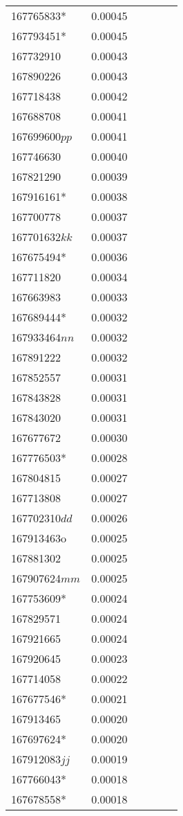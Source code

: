 \begin{landscape}
\begin{longtable}{p{1.8cm}p{0.9cm}p{2.2cm}p{1cm}p{2.8cm}p{13.4cm}}
167765833*&0.00045&&&& \\
167793451*&0.00045&&&& \\
167732910&0.00043&&&& \\
167890226&0.00043&&&& \\
167718438&0.00042&&&& \\
167688708&0.00041&&&& \\
167699600$pp$&0.00041&&&& \\
167746630&0.00040&&&& \\
167821290&0.00039&&&& \\
167916161*&0.00038&&&& \\
167700778&0.00037&&&& \\
167701632$kk$&0.00037&&&& \\
167675494*&0.00036&&&& \\
167711820&0.00034&&&& \\
167663983&0.00033&&&& \\
167689444*&0.00032&&&& \\
167933464$nn$&0.00032&&&& \\
167891222&0.00032&&&& \\
167852557&0.00031&&&& \\
167843828&0.00031&&&& \\
167843020&0.00031&&&& \\
167677672&0.00030&&&& \\
167776503*&0.00028&&&& \\
167804815&0.00027&&&& \\
167713808&0.00027&&&& \\
167702310$dd$&0.00026&&&& \\
167913463o&0.00025&&&& \\
167881302&0.00025&&&& \\
167907624$mm$&0.00025&&&& \\
167753609*&0.00024&&&& \\
167829571&0.00024&&&& \\
167921665&0.00024&&&& \\
167920645&0.00023&&&& \\
167714058&0.00022&&&& \\
167677546*&0.00021&&&& \\
167913465&0.00020&&&& \\
167697624*&0.00020&&&& \\
167912083$jj$&0.00019&&&& \\
167766043*&0.00018&&&& \\
167678558*&0.00018&&&& \\

\end{longtable}
\end{landscape}
